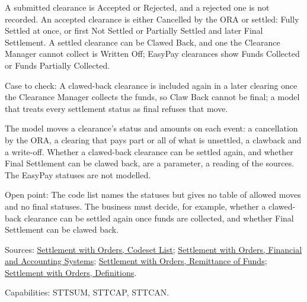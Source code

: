 \begin{definition}
  \label{def:accounting-clearance-status}
  A submitted clearance is Accepted or Rejected, and a rejected one is not
  recorded. An accepted clearance is either Cancelled by the ORA or settled:
  Fully Settled at once, or first Not Settled or Partially Settled and later
  Final Settlement. A settled clearance can be Clawed Back, and one the
  Clearance Manager cannot collect is Written Off; EasyPay clearances show
  Funds Collected or Funds Partially Collected.

  Case to check: A clawed-back clearance is included again in a later
  clearing once the Clearance Manager collects the funds, so Claw Back
  cannot be final; a model that treats every settlement status as final
  refuses that move.

  The model moves a clearance's status and amounts on each event: a
  cancellation by the ORA, a clearing that pays part or all of what is
  unsettled, a clawback and a write-off.  Whether a clawed-back clearance
  can be settled again, and whether Final Settlement can be clawed back, are
  a parameter, a reading of the sources.  The EasyPay statuses are not
  modelled.

  Open point: The code list names the statuses but gives no table of allowed
  moves and no final statuses. The business must decide, for example,
  whether a clawed-back clearance can be settled again once funds are
  collected, and whether Final Settlement can be clawed back.

  Sources: \href{https://standards.atlassian.net/wiki/spaces/SWO/pages/574456090}{Settlement with Orders, Codeset List};
  \href{https://standards.atlassian.net/wiki/spaces/SWO/pages/574554300}{Settlement with Orders, Financial and Accounting Systems};
  \href{https://standards.atlassian.net/wiki/spaces/SWO/pages/574718145}{Settlement with Orders, Remittance of Funds};
  \href{https://standards.atlassian.net/wiki/spaces/SWO/pages/574915056}{Settlement with Orders, Definitions}.

  Capabilities: STTSUM, STTCAP, STTCAN.
\end{definition}

